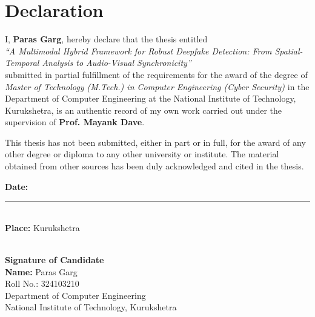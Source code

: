 \chapter*{Declaration}
\thispagestyle{empty}
I, \textbf{Paras Garg}, hereby declare that the thesis entitled\\
\textit{``A Multimodal Hybrid Framework for Robust Deepfake Detection: From Spatial-Temporal Analysis to Audio-Visual Synchronicity''}\\
submitted in partial fulfillment of the requirements for the award of the degree of \textit{Master of Technology (M.Tech.) in Computer Engineering (Cyber Security)} in the Department of Computer Engineering at the National Institute of Technology, Kurukshetra, is an authentic record of my own work carried out under the supervision of \textbf{Prof. Mayank Dave}.

This thesis has not been submitted, either in part or in full, for the award of any other degree or diploma to any other university or institute. The material obtained from other sources has been duly acknowledged and cited in the thesis.

\vspace{1.5cm}
\noindent
\begin{minipage}[t]{0.55\textwidth}
\textbf{Date:} \rule{3.5cm}{0.2pt}\\[0.6cm]
\textbf{Place:} Kurukshetra
\end{minipage}
\hfill
\begin{minipage}[t]{0.4\textwidth}
\makebox[0.9\linewidth]{\hrulefill}\\
\textbf{Signature of Candidate}\\
\textbf{Name:} Paras Garg\\
Roll No.: 324103210\\
Department of Computer Engineering\\
National Institute of Technology, Kurukshetra
\end{minipage}

\clearpage
